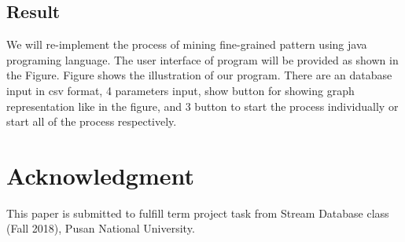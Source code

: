 \documentclass[conference]{IEEEtran}
\begin{document}
\subsection{Result}
We will re-implement the process of mining fine-grained pattern using java programing language. The user interface of program will be provided as shown in the Figure. Figure shows the illustration of our program. There are an database input in csv format, 4 parameters input,  show button for showing graph representation like in the figure, and 3 button to start the process individually or start all of the process respectively.

\section*{Acknowledgment}
This paper is submitted to fulfill term project task from Stream Database class (Fall 2018), Pusan National University.



\end{document}
